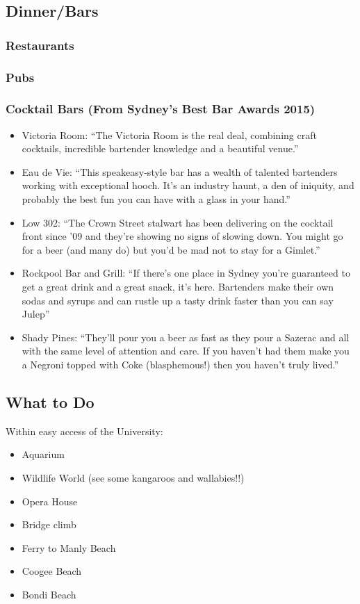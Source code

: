 \subsection*{Dinner/Bars}

\subsubsection*{Restaurants}


\subsubsection*{Pubs}

\subsubsection*{Cocktail Bars (From Sydney's Best Bar Awards 2015)}
\begin{itemize}
 \item Victoria Room: ``The Victoria Room is the real deal, combining craft cocktails, incredible bartender knowledge and a beautiful venue.''
\item Eau de Vie: ``This speakeasy-style bar has a wealth of talented bartenders working with exceptional hooch. It’s an industry haunt, a den of iniquity, and probably the best fun you can have with a glass in your hand.''
\item Low 302: ``The Crown Street stalwart has been delivering on the cocktail front since ’09 and they’re showing no signs of slowing down. You might go for a beer (and many do) but you’d be mad not to stay for a Gimlet.''
\item Rockpool Bar and Grill: ``If there’s one place in Sydney you’re guaranteed to get a great drink and a great snack, it’s here. Bartenders make their own sodas and syrups and can rustle up a tasty drink faster than you can say Julep''
\item Shady Pines: ``They’ll pour you a beer as fast as they pour a Sazerac and all with the same level of attention and care. If you haven’t had them make you a Negroni topped with Coke (blasphemous!) then you haven’t truly lived.''
\end{itemize}



\subsection*{What to Do}
Within easy access of the University:
\begin{itemize}
 \item Aquarium
\item Wildlife World (see some kangaroos and wallabies!!)
\item Opera House
\item Bridge climb
\item Ferry to Manly Beach
\item Coogee Beach
\item Bondi Beach
\end{itemize}

